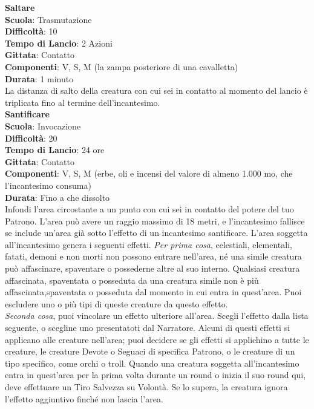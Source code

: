 \begin{multicols}{2}
\medskip\textbf{Saltare}\\
\textbf{Scuola}: Trasmutazione\\
\textbf{Difficoltà}: 10\\
\textbf{Tempo di Lancio}: 2 Azioni\\
\textbf{Gittata}: Contatto\\
\textbf{Componenti}: V, S, M (la zampa posteriore di una cavalletta)\\
\textbf{Durata}: 1 minuto\\
La distanza di salto della creatura con cui sei in contatto al momento del lancio è triplicata fino al termine dell'incantesimo.\\

\medskip\textbf{Santificare}\\
\textbf{Scuola}: Invocazione\\
\textbf{Difficoltà}: 20\\
\textbf{Tempo di Lancio}: 24 ore\\
\textbf{Gittata}: Contatto\\
\textbf{Componenti}: V, S, M (erbe, oli e incensi del valore di almeno 1.000 mo, che l'incantesimo consuma)\\
\textbf{Durata}: Fino a che dissolto\\
Infondi l'area circostante a un punto con cui sei in contatto del potere del tuo Patrono. L'area può avere un raggio massimo di 18 metri, e l'incantesimo fallisce se include un'area già sotto l'effetto di un incantesimo santificare. L'area soggetta all'incantesimo genera i seguenti effetti.
\textit{Per prima cosa}, celestiali, elementali, fatati, demoni e non morti non possono entrare nell'area, né una simile creatura può affascinare, spaventare o possederne altre al suo interno. Qualsiasi creatura affascinata, spaventata o posseduta da una creatura simile non è più affascinata,spaventata o posseduta dal momento in cui entra in quest'area. Puoi escludere uno o più tipi di queste creature da questo effetto.\\
\textit{Seconda cosa}, puoi vincolare un effetto ulteriore all'area. Scegli l'effetto dalla lista seguente, o scegline uno presentatoti dal Narratore. Alcuni di questi effetti si applicano alle creature nell'area; puoi decidere se gli effetti si applichino a tutte le creature, le creature Devote o Seguaci di specifica Patrono, o le creature di un tipo specifico, come orchi o troll. Quando una creatura soggetta all'incantesimo entra in quest'area per la prima volta durante un round o inizia il suo round qui, deve effettuare un Tiro Salvezza su Volontà. Se lo supera, la creatura ignora l'effetto aggiuntivo finché non lascia l'area.\\

\end{multicols}
